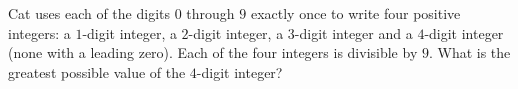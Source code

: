 Cat uses each of the digits $0$ through $9$ exactly once to write four positive integers: a $1$-digit integer, a $2$-digit integer, a $3$-digit integer and a $4$-digit integer (none with a leading zero). Each of the four integers is divisible by $9$. What is the greatest possible value of the $4$-digit integer?
